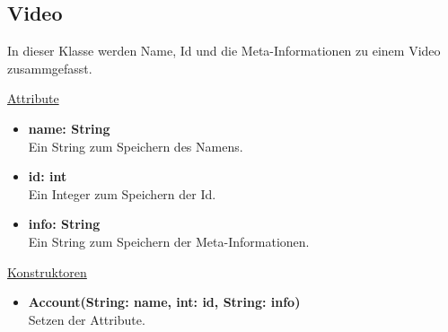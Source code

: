 \newpage
\subsection{Video}\label{Video}
In dieser Klasse werden Name, Id und die Meta-Informationen zu einem Video zusammgefasst. \newline

\underline{Attribute}
\begin{itemize}
\itemsep0pt
\item \textbf{name: String} \hfill\\ 
Ein String zum Speichern des Namens.

\item \textbf{id: int} \hfill\\ 
Ein Integer zum Speichern der Id.

\item \textbf{info: String} \hfill\\ 
Ein String zum Speichern der Meta-Informationen.

\end{itemize}

\underline{Konstruktoren}
\begin{itemize}
\itemsep0pt
\item \textbf{Account(String: name, int: id, String: info)} \hfill\\
Setzen der Attribute.
\end{itemize}
